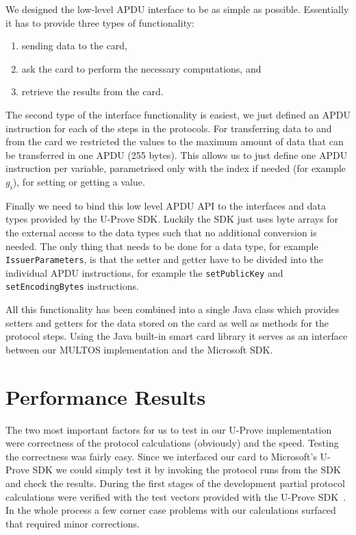 We designed the low-level APDU interface to be as simple as possible.
Essentially it has to provide three types of functionality:
\begin{enumerate}
  \item sending data to the card,
  \item ask the card to perform the necessary computations, and
  \item retrieve the results from the card.
\end{enumerate}
The second type of the interface functionality is easiest, we just defined an
APDU instruction for each of the steps in the protocols. For transferring data
to and from the card we restricted the values to the maximum amount of data that
can be transferred in one APDU (255 bytes). This allows us to just define one
APDU instruction per variable, parametrised only with the index if needed (for
example $g_i$), for setting or getting a value.

Finally we need to bind this low level APDU API to the interfaces and data types
provided by the U-Prove SDK. Luckily the SDK just uses byte arrays for the
external access to the data types such that no additional conversion is needed.
The only thing that needs to be done for a data type, for example
\lstinline{IssuerParameters}, is that the setter and getter have to be
divided into the individual APDU instructions, for example the
\lstinline{setPublicKey} and \lstinline{setEncodingBytes} instructions.

All this functionality has been combined into a single Java class which provides
setters and getters for the data stored on the card as well as methods for the
protocol steps. Using the Java built-in smart card library it serves as an
interface between our MULTOS implementation and the Microsoft SDK.

\section{Performance Results}

The two most important factors for us to test in our U-Prove implementation were
correctness of the protocol calculations (obviously) and the speed. Testing the
correctness was fairly easy. Since we interfaced our card to Microsoft's U-Prove
SDK we could simply test it by invoking the protocol runs from the SDK and check
the results. During the first stages of the development partial protocol
calculations were verified with the test vectors provided with the U-Prove
SDK~\cite{U-Prove_Vectors2011}. In the whole process a few corner case problems
with our calculations surfaced that required minor corrections.

